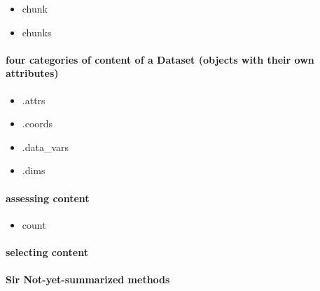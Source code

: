 \documentclass[11pt]{article}
\providecommand{\tightlist}{%
      \setlength{\itemsep}{0pt}\setlength{\parskip}{0pt}}
\begin{document}
\begin{itemize}
\tightlist
\item
  chunk
\item
  chunks
\end{itemize}

\hypertarget{four-categories-of-content-of-a-dataset-objects-with-their-own-attributes}{%
\paragraph{four categories of content of a Dataset (objects with their
own
attributes)}\label{four-categories-of-content-of-a-dataset-objects-with-their-own-attributes}}

\begin{itemize}
\tightlist
\item
  .attrs
\item
  .coords
\item
  .data\_vars
\item
  .dims
\end{itemize}

\hypertarget{assessing-content}{%
\paragraph{assessing content}\label{assessing-content}}

\begin{itemize}
\tightlist
\item
  count
\end{itemize}

\hypertarget{selecting-content}{%
\paragraph{selecting content}\label{selecting-content}}

\hypertarget{sir-not-yet-summarized-methods}{%
\paragraph{Sir Not-yet-summarized
methods}\label{sir-not-yet-summarized-methods}}
\end{document}
